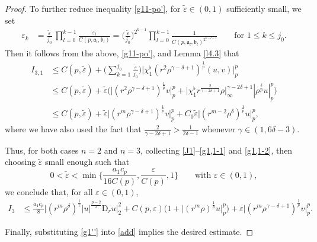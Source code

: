 \documentclass[11pt,reqno]{amsart}
\numberwithin{rk}{section}
\numberwithin{prop}{section}
\numberwithin{mydef}{section}
\numberwithin{lem}{section}
\numberwithin{equation}{section}
\numberwithin{thm}{section}
\begin{document}
\begin{proof}
To further reduce inequality \eqref{g11-po'}, for $\tilde\varepsilon\in (0,1)$ sufficiently small, 
we set 
\begin{align*}
\varepsilon_{k}&=\frac{\tilde\varepsilon}{j_0}\,
\prod_{l=0}^{k-1}\frac{\varepsilon_l}{C(p,\mathfrak{a}_l,\mathfrak{b}_l)}=\big(\frac{\tilde\varepsilon}{j_0}\big)^{2^{k-1}}\prod_{l=0}^{k-1} \frac{1}{ C(p,\mathfrak{a}_l,\mathfrak{b}_l)^{2^{k-l-1}}} \qquad 
\text{for $1\leq k\leq j_0$}.
\end{align*}
Then it follows from the above, \eqref{g11-po'}, and Lemma \ref{l4.3} that
\begin{equation}\label{g1,1-2}
\begin{aligned}
I_{3,1}&\leq C(p,\tilde\varepsilon) + \Big(\sum_{k=1}^{j_0} \frac{\tilde\varepsilon}{j_0}\Big) \big|\chi_1^\flat(r^2\rho^{\gamma-\delta+1})^\frac{1}{p}(u,v)\big|_{p}^{p}\\[-2pt]
&\leq C(p,\tilde\varepsilon)+\tilde\varepsilon\big(\big|(r^2\rho^{\gamma-\delta+1})^\frac{1}{p}v\big|_{p}^{p}+\big|\chi_1^\flat r^\frac{2}{\gamma-2\delta+1}\rho\big|_\infty^{\gamma-2\delta+1}|\rho^\frac{\delta}{p} u|_{p}^{p}\big)\\[2pt]
&\leq C(p,\tilde\varepsilon)+ \tilde\varepsilon \big|(r^m\rho^{\gamma-\delta+1})^\frac{1}{p}v\big|_{p}^{p}+C_0\tilde\varepsilon\big|(r^{m-2}\rho^\delta)^\frac{1}{p} u\big|_{p}^{p},
\end{aligned}    
\end{equation}
where we have also used the fact that $\frac{2}{\gamma-2\delta+1}>\frac{1}{2\delta-1}$ whenever $\gamma\in (1,6\delta-3)$.
 

Thus, for both cases $n=2$ and $n=3$, collecting \eqref{J1}--\eqref{g1,1-1} and \eqref{g1,1-2}, then choosing $\tilde{\varepsilon}$ small enough such that
\begin{equation*}
0<\tilde{\varepsilon}< \min\big\{\frac{a_1 c_p}{16C(p)},\frac{\varepsilon}{C(p)},1\big\} \qquad\text{with $\varepsilon\in (0,1)$},
\end{equation*}
we conclude that, for all $\varepsilon\in (0,1)$,
\begin{equation}\label{g1''}
\begin{aligned}
I_3&\leq \frac{a_1 c_p}{8} \big|(r^m\rho^\delta)^{\frac12} |u|^{\frac{p-2}{2}} \mathrm{D}_r u\big|_2^2+C(p,\varepsilon)\big(1+\big|(r^m\rho)^\frac{1}{p}u\big|_{p}^{p}\big) + \varepsilon \big|(r^m\rho^{\gamma-\delta+1})^\frac{1}{p}v\big|_{p}^{p}.
\end{aligned}    
\end{equation}


 

Finally, substituting  \eqref{g1''} into \eqref{add} implies the desired estimate.
\end{proof}
\end{document}

